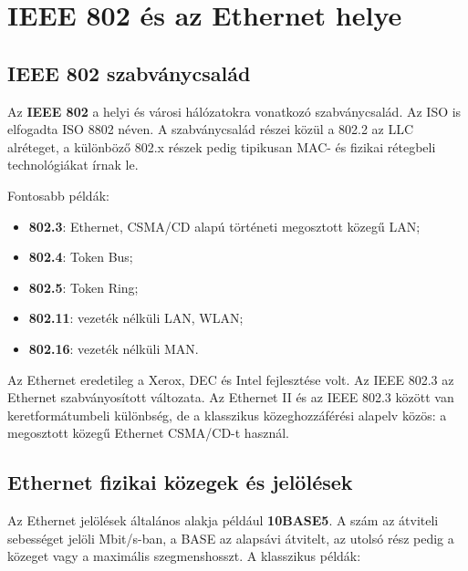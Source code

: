 \begin{center}

\end{center}

\section{IEEE 802 és az Ethernet helye}

\subsection{IEEE 802 szabványcsalád}

Az \textbf{IEEE 802} a helyi és városi hálózatokra vonatkozó szabványcsalád. Az ISO is elfogadta ISO 8802 néven. A szabványcsalád részei közül a 802.2 az LLC alréteget, a különböző 802.x részek pedig tipikusan MAC- és fizikai rétegbeli technológiákat írnak le.

Fontosabb példák:

\begin{itemize}
  \item \textbf{802.3}: Ethernet, CSMA/CD alapú történeti megosztott közegű LAN;
  \item \textbf{802.4}: Token Bus;
  \item \textbf{802.5}: Token Ring;
  \item \textbf{802.11}: vezeték nélküli LAN, WLAN;
  \item \textbf{802.16}: vezeték nélküli MAN.
\end{itemize}

Az Ethernet eredetileg a Xerox, DEC és Intel fejlesztése volt. Az IEEE 802.3 az Ethernet szabványosított változata. Az Ethernet II és az IEEE 802.3 között van keretformátumbeli különbség, de a klasszikus közeghozzáférési alapelv közös: a megosztott közegű Ethernet CSMA/CD-t használ.

\subsection{Ethernet fizikai közegek és jelölések}

Az Ethernet jelölések általános alakja például \textbf{10BASE5}. A szám az átviteli sebességet jelöli Mbit/s-ban, a BASE az alapsávi átvitelt, az utolsó rész pedig a közeget vagy a maximális szegmenshosszt. A klasszikus példák:

